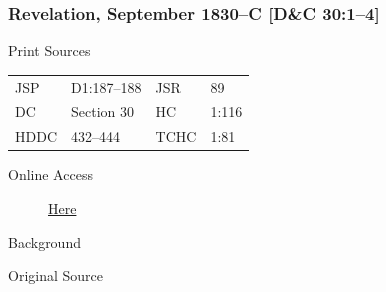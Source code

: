 		\subsubsection{Revelation, September 1830--C [D\&C 30:1--4]}
			\label{EMS-1830-JS-SEP-1830-C}
		
			\begin{description}
				\item[Print Sources]
			\end{description}

				\begin{tabular}{p{0.5in}p{1in}p{0.5in}p{1in}}
				JSP	 	& D1:187--188	& JSR 		& 89	 \\
				DC	 	& Section 30	& HC 		& 1:116 \\
				HDDC 	& 432--444		& TCHC 		& 1:81 \\
				\end{tabular}
			
			\begin{description}
				\item[Online Access] \href{https://www.josephsmithpapers.org/paper-summary/revelation-september-1830-c-dc-301-4/1}{Here}
			\end{description}
			
			\begin{description}
				\item[Background]
			\end{description}
			
			
			\begin{description}
				\item[Original Source]
			\end{description}
			
			
